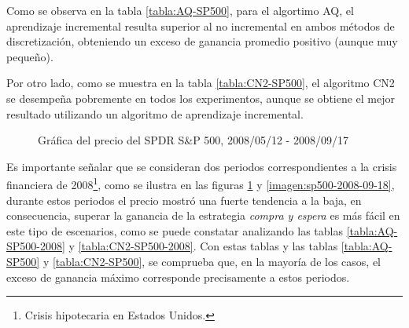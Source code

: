 \documentclass[12pt]{report}
\theoremstyle{break}
\theoremstyle{break}
\begin{document}
Como se observa en la tabla \ref{tabla:AQ-SP500}, para el algortimo AQ, el aprendizaje incremental resulta superior al no incremental en ambos métodos de discretización, obteniendo un exceso de ganancia promedio positivo (aunque muy pequeño).

Por otro lado, como se muestra en la tabla \ref{tabla:CN2-SP500}, el algoritmo CN2 se desempeña pobremente en todos los experimentos, aunque se obtiene el mejor resultado utilizando un algoritmo de aprendizaje incremental.

\begin{figure}[htbp]
\centering
{}
\caption{\label{imagen:sp500-2008-05-12} Gráfica del precio del SPDR S\&P 500, 2008/05/12 - 2008/09/17}
\end{figure}

Es importante señalar que se consideran dos periodos correspondientes a la crisis financiera de 2008\footnote{Crisis hipotecaria en Estados Unidos.}, como se ilustra en las figuras \ref{imagen:sp500-2008-05-12} y \ref{imagen:sp500-2008-09-18}, durante estos periodos el precio mostró una fuerte tendencia a la baja, en consecuencia, superar la ganancia de la estrategia \textit{compra y espera} es más fácil en este tipo de escenarios, como se puede constatar analizando las tablas \ref{tabla:AQ-SP500-2008} y \ref{tabla:CN2-SP500-2008}. Con estas tablas y las tablas \ref{tabla:AQ-SP500} y \ref{tabla:CN2-SP500}, se comprueba que, en la mayoría de los casos, el exceso de ganancia máximo corresponde precisamente a estos periodos.
\end{document}
